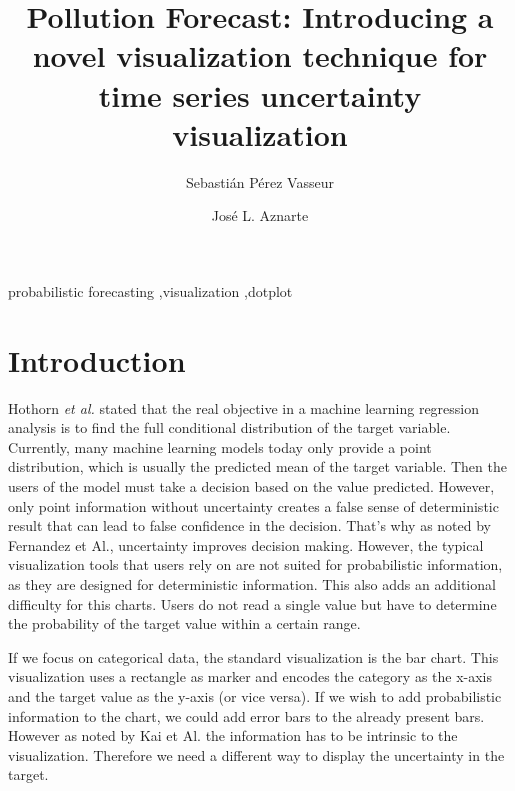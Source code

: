 \documentclass[a4paper,3p,sort&compress]{elsarticle}
\begin{document}
\linenumbers

\newcommand{\no}{NO\textsubscript{2}\xspace}

\begin{frontmatter}

  \title{Pollution Forecast: Introducing a novel visualization technique for time series uncertainty visualization}


  \author{Sebasti\'an P\'erez Vasseur}
  \author{Jos\'e L. Aznarte}
  \address{Artificial Intelligence Department\\Universidad Nacional de
    Educaci\'on a Distancia --- UNED\\c/ Juan del Rosal, 16, Madrid, Spain}
  

\begin{abstract}
  
\end{abstract}

\begin{keyword}
probabilistic forecasting \sep visualization \sep dotplot
\end{keyword}

\end{frontmatter}


\section{Introduction}
\label{sec:intro}

Hothorn \emph{et al.} stated that the real
objective in a machine learning regression analysis is to find the full conditional distribution
of the target variable. Currently, many machine learning models today only provide a point distribution, 
which is usually the predicted
mean of the target variable. Then the users of the model must take a decision based on the value predicted. 
However, only point information without uncertainty creates a false sense of deterministic result that can lead 
to false confidence in the decision. That's why as noted by Fernandez et Al., uncertainty improves decision making. 
However, the typical visualization tools that users rely on are not suited for probabilistic information, 
as they are designed for deterministic information. This also adds an additional difficulty for this charts. Users do not read
a single value but have to determine the probability of the target value within a certain range.

If we focus on categorical data, the standard visualization is the bar chart. This visualization uses a rectangle as marker and 
encodes the category as the x-axis and the target value as the y-axis (or vice versa). If we wish to add probabilistic information 
to the chart, we could add error bars to the already present bars. However as noted by Kai et Al. 
the information has to be intrinsic to the visualization. Therefore we need a different way to display the uncertainty in the target.
\end{document}
